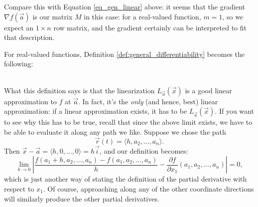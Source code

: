 Compare this with Equation \eqref{eq_gen_linear} above: it seems that the gradient $\nabla f (\vec{a})$ is our matrix $M$ in this case: for a real-valued function, $m=1$, so we expect an $1\times n$ row matrix, and the gradient certainly can be interpreted to fit that description.


For real-valued functions, Definition \ref{def:general_differentiability} becomes the following:

\\

What this definition says is that the linearization $L_{\vec{a}}(\vec{x})$ is a good linear approximation to $f$ at $\vec{a}$. In fact, it's the {\em only} (and hence, best) linear approximation: if a linear approximation exists, it has to be $L_{\vec{a}}(\vec{x})$. If you want to see why this has to be true, recall that since the above limit exists, we have to be able to evaluate it along any path we like. Suppose we chose the path 
\[
\vec{r}(t) = \langle h,a_2,\ldots, a_n\rangle.
\]
Then $\vec{x}-\vec{a} = \langle h,0,\ldots, 0\rangle = h\vec{i}$, and our definition becomes:
\[
\lim_{h\to 0}\left\lvert\frac{f(a_1+h,a_2,\ldots, a_n)-f(a_1,a_2,\ldots, a_n)}{h} - \frac{\partial f}{\partial x_1}(a_1,a_2,\ldots, a_n)\right\rvert = 0,
\]
which is just another way of stating the definition of the partial derivative with respect to $x_1$. Of course, approaching along any of the other coordinate directions will similarly produce the other partial derivatives.


